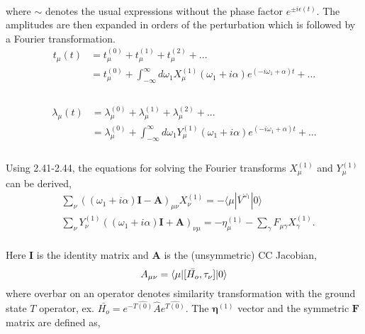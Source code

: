 \\
where $\sim$ denotes the usual expressions without the phase factor $e^{\pm i\epsilon(t)}$. 
The amplitudes are then expanded in orders of the perturbation which is followed by a Fourier transformation.
\\
\begin{equation}
\begin{split}
t_\mu(t) &= t^{(0)}_\mu +  t^{(1)}_\mu +  t^{(2)}_\mu + ... \\
&= t^{(0)}_\mu +  \int_{-\infty}^{\infty} d\omega_1 X^{(1)}_\mu(\omega_1 + i\alpha)e^{(-i\omega_1 + \alpha) t}  + ... \\
\end{split}
\end{equation}
\\
\begin{equation}
\begin{split}
\lambda_\mu(t) &= \lambda^{(0)}_\mu +  \lambda^{(1)}_\mu +  \lambda^{(2)}_\mu + ... \\
&= \lambda^{(0)}_\mu +  \int_{-\infty}^{\infty} d\omega_1 Y^{(1)}_\mu(\omega_1 + i\alpha)e^{(-i\omega_1 + \alpha) t}  + ... \\
\end{split}
\end{equation}
\\
Using 2.41-2.44, the equations for solving the Fourier transforms 
$X^{(1)}_\mu$ and $Y^{(1)}_\mu$ can be derived, 
\\
\begin{equation}
\begin{split}
&\sum_\nu {((\omega_1 + i\alpha)\bm{I} - \bm{A})}_{\mu\nu} X^{(1)}_{\nu}
= -\langle \mu|\overbar{V}^{\omega_1}|0 \rangle \\
&\sum_\nu Y_{\nu}^{(1)}{((\omega_1 + i\alpha)\bm{I} + \bm{A})}_{\nu\mu} = -\eta^{(1)}_{\mu} -
\sum_{\gamma} F_{\mu\gamma} X^{(1)}_{\gamma}.
\end{split}
\end{equation}
\\
Here $\bm{I}$ is the identity matrix and $\bm{A}$ is the (unsymmetric) CC Jacobian,
\begin{equation}
A_{\mu\nu} = \langle \mu |[\bar{H_o}, \tau_\nu]| 0 \rangle
\end{equation}
where overbar on an operator denotes similarity transformation with the ground state
$T$ operator, ex. $\bar{H_o} = e^{-\hat{T(0)}}\hat{A}e^{\hat{T(0)}}$.
The $\bm{\eta}^{(1)}$ vector and the symmetric $\bm{F}$ matrix are defined as,
\\
